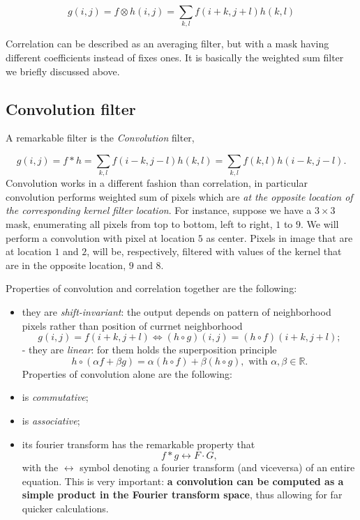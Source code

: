\documentclass[10pt]{report}
\begin{document}
\[ g(i, j) = f \otimes h (i, j) = \sum_{k, l} f(i + k, j + l) h(k, l)\]

Correlation can be described as an averaging filter, but with a mask
having different coefficients instead of fixes ones. It is basically the
weighted sum filter we briefly discussed above.

\subsection{Convolution filter}
\label{convolution-filter}
A remarkable filter is the \emph{Convolution} filter,

\[ g(i, j) = f * h = \sum_{k, l} f(i - k, j - l) h(k, l) = \sum_{k, l} f(k, l) h(i - k, j - l).\]
Convolution works in a different fashion than correlation, in particular
convolution performs weighted sum of pixels which are \emph{at the opposite
location of the corresponding kernel filter location}. For instance,
suppose we have a \(3 \times 3\) mask, enumerating all pixels from top
to bottom, left to right, \(1\) to \(9\). We will perform a convolution
with pixel at location \(5\) as center. Pixels in image that are at
location \(1\) and \(2\), will be, respectively, filtered with values of
the kernel that are in the opposite location, \(9\) and \(8\).

Properties of convolution and correlation together are the following:

\begin{itemize}
\item they are \emph{shift-invariant}: the output depends on pattern of
neighborhood pixels rather than position of currnet neighborhood
\[g(i, j) = f(i + k, j + l) \Leftrightarrow (h \circ g)(i, j) = (h \circ f)(i + k, j + l);\] -
they are \emph{linear}: for them holds the superposition principle
\[h \circ (\alpha f + \beta g) = \alpha(h \circ f) + \beta(h \circ g), \mbox { with } \alpha, \beta \in \mathbb{R}.\]
Properties of convolution alone are the following:

\item is \emph{commutative};

\item is \emph{associative};

\item its fourier transform has the remarkable property
that \[ f * g \longleftrightarrow F\cdot G,\] with the
\(\longleftrightarrow\) symbol denoting a fourier transform (and
viceversa) of an entire equation. This is very important: \textbf{a
convolution can be computed as a simple product in the Fourier
transform space}, thus allowing for far quicker calculations.
\end{itemize}
\end{document}
